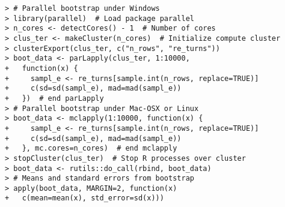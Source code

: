 \documentclass[10pt]{beamer}\usepackage[]{graphicx}\usepackage[]{color}
\makeatletter
\newenvironment{kframe}{%
 \def\at@end@of@kframe{}%
 \ifinner\ifhmode%
  \def\at@end@of@kframe{\end{minipage}}%
  \begin{minipage}{\columnwidth}%
 \fi\fi%
 \def\FrameCommand##1{\hskip\@totalleftmargin \hskip-\fboxsep
 \colorbox{shadecolor}{##1}\hskip-\fboxsep
     \hskip-\linewidth \hskip-\@totalleftmargin \hskip\columnwidth}%
 \MakeFramed {\advance\hsize-\width
   \@totalleftmargin\z@ \linewidth\hsize
   \@setminipage}}%
 {\par\unskip\endMakeFramed%
 \at@end@of@kframe}
\newenvironment{knitrout}{}{} %
\makeatother
\begin{document}
\begin{frame}[fragile,t]{\subsecname}
\begin{block}{}
\begin{columns}[T]
\begin{knitrout}
\begin{kframe}
\begin{verbatim}
> # Parallel bootstrap under Windows
> library(parallel)  # Load package parallel
> n_cores <- detectCores() - 1  # Number of cores
> clus_ter <- makeCluster(n_cores)  # Initialize compute cluster
> clusterExport(clus_ter, c("n_rows", "re_turns"))
> boot_data <- parLapply(clus_ter, 1:10000,
+   function(x) {
+     sampl_e <- re_turns[sample.int(n_rows, replace=TRUE)]
+     c(sd=sd(sampl_e), mad=mad(sampl_e))
+   })  # end parLapply
> # Parallel bootstrap under Mac-OSX or Linux
> boot_data <- mclapply(1:10000, function(x) {
+     sampl_e <- re_turns[sample.int(n_rows, replace=TRUE)]
+     c(sd=sd(sampl_e), mad=mad(sampl_e))
+   }, mc.cores=n_cores)  # end mclapply
> stopCluster(clus_ter)  # Stop R processes over cluster
> boot_data <- rutils::do_call(rbind, boot_data)
> # Means and standard errors from bootstrap
> apply(boot_data, MARGIN=2, function(x)
+   c(mean=mean(x), std_error=sd(x)))
\end{verbatim}
\end{kframe}
\end{knitrout}
  \end{columns}
\end{block}

\end{frame}


\end{document}
